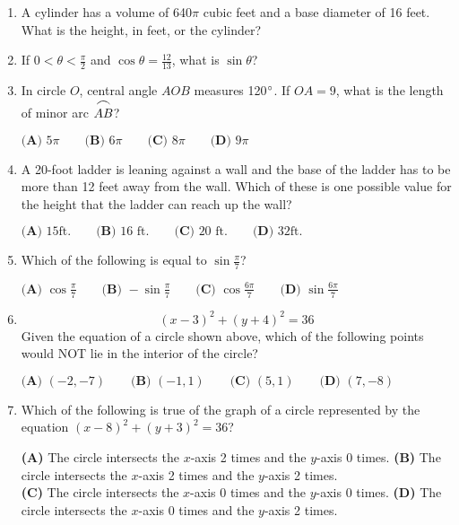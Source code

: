 \documentclass[../satmath.tex]{subfiles}
\begin{document}
\begin{enumerate}[label=\bfseries\arabic*.]
\item A cylinder has a volume of 640$\pi$ cubic feet and a base diameter of 16 feet. What is the height, in feet, or the cylinder?
 
\item If $0<\theta<\frac{\pi}{2}$ and $\cos \theta = \frac{12}{13}$, what is $\sin \theta$?
 
\item In circle $O$, central angle $AOB$ measures 120$\degree$. If $OA=9$, what is the length of minor arc $\stackrel{\mbox{\large$\frown$}}{AB}$?

$\textbf{(A) } 5\pi \qquad \textbf{(B) } 6\pi \qquad \textbf{(C) } 8\pi \qquad \textbf{(D) } 9\pi$
 
\item A 20-foot ladder is leaning against a wall and the base of the ladder has to be more than 12 feet away from the wall. Which of these is one possible value for the 
height that the ladder can reach up the wall?

$\textbf{(A) } 15 \text{ft.} \qquad \textbf{(B) } 16 \text{ ft.} \qquad \textbf{(C) } 20 \text{ ft.} \qquad \textbf{(D) } 32 \text {ft.}$ 
 
\item Which of the following is equal to $\sin \frac{\pi}{7}$?

$\textbf{(A) }\cos \frac{\pi}{7} \qquad \textbf{(B) } -\sin \frac{\pi}{7} \qquad \textbf{(C) } \cos \frac{6\pi}{7} \qquad \textbf{(D) } \sin \frac{6\pi}{7}$ 
 
\item
\[(x-3)^2+(y+4)^2=36\]
Given the equation of a circle shown above, which of the following points would NOT lie in the interior of the circle?

$\textbf{(A) } (-2, -7) \qquad \textbf{(B) } (-1, 1) \qquad \textbf{(C) } (5, 1) \qquad \textbf{(D) } (7, -8)$
 
\item Which of the following is true of the graph of a circle represented by the equation $(x-8)^2+(y+3)^2=36$?

\textbf{(A) } The circle intersects the $x$-axis 2 times and the $y$-axis 0 times. \qquad 
\textbf{(B) } The circle intersects the $x$-axis 2 times and the $y$-axis 2 times.\\
\textbf{(C) } The circle intersects the $x$-axis 0 times and the $y$-axis 0 times. \qquad
\textbf{(D) } The circle intersects the $x$-axis 0 times and the $y$-axis 2 times.
 
\end{enumerate}
\end{document}
